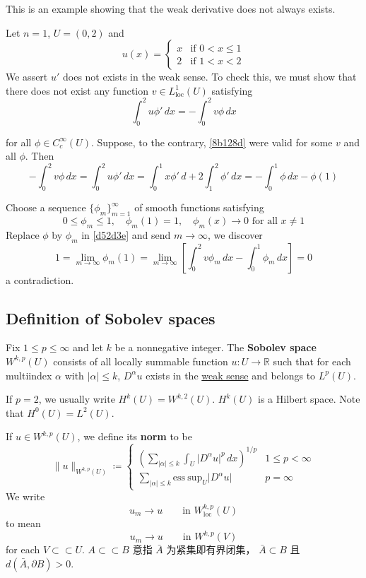 This is an example showing that the weak derivative does not always exists.

Let $n=1$, $U=(0,2)$ and
\[
u(x)=\begin{cases}
x & \text{if }0<x\leq 1  \\
2 & \text{if }1<x<2
\end{cases}
\]
We assert $u'$ does not exists in the weak sense. To check this, we must show that there does not exist any function $v\in L^{1}_{\text{loc}}(U)$ satisfying
\begin{equation}
\int_{0}^{2} u\phi' \, dx =-\int_{0}^{2} v\phi \, dx
\label{8b128d}
\end{equation}

for all $\phi\in C^{\infty}_{c}(U)$. Suppose, to the contrary, \cref{8b128d}   were valid for some $v$ and all $\phi$. Then
\begin{equation}
-\int_{0}^{2} v\phi \, dx =\int_{0}^{2} u\phi' \, dx =\int_{0}^{1} x\phi' \, d+2\int_{1}^{2} \phi' \, dx =-\int_{0}^{1} \phi \, dx -\phi(1)
\label{d52d3e}
\end{equation}

Choose a sequence $\{ \phi _m \}_{m=1}^{\infty}$ of smooth functions satisfying
\[
0\leq \phi _m\leq 1,\quad \phi _m(1)=1,\quad \phi _m(x)\to0\text{ for all }x\neq 1
\]
Replace $\phi$ by $\phi _m$ in \cref{d52d3e} and send $m \to \infty$, we discover
\[
1=\lim_{ m \to \infty } \phi _m(1)=\lim_{ m \to \infty } \left[ \int_{0}^{2} v\phi _m \, dx -\int_{0}^{1} \phi _m \, dx  \right]=0
\]
a contradiction.

\subsection{Definition of Sobolev spaces}

Fix $1\leq p\leq \infty$ and let $k$ be a nonnegative integer. The \textbf{Sobolev space} $W^{k,p}(U)$ consists of all locally summable function $u:U\to \mathbb{R}$ such that for each multiindex $\alpha$ with $\lvert \alpha \rvert\leq k$, $D^{\alpha}u$ exists in the \underline{weak sense} and belongs to $L^{p}(U)$.

\begin{remark}
If $p=2$, we usually write $H^{k}(U)=W^{k,2}(U)$. $H^{k}(U)$ is a Hilbert space. Note that $H^{0}(U)=L^{2}(U)$.
\end{remark}
If $u\in W^{k,p}(U)$, we define its \textbf{norm} to be
\[
\lVert u \rVert _{W^{k,p}(U)}\coloneqq \begin{cases}
\left( \sum_{\lvert \alpha \rvert \leq k}\int_{U}^{} \lvert D^{\alpha}u \rvert ^{p} \, dx  \right)^{1/p } & 1\leq p<\infty \\
\sum_{\lvert \alpha \rvert \leq k}\mathrm{ess\ sup} _{U}\lvert D^{\alpha}u \rvert  & p=\infty
\end{cases}
\]
We write
\[
u_m\to u\qquad \text{in }W_{\text{loc}}^{k,p}(U)
\]
to mean
\[
u_m\to u\qquad \text{in }W^{k,p}(V)
\]
for each $V\subset \subset U$. $A \subset \subset B$ 意指 $\bar{A}$ 为紧集即有界闭集， $\bar{A} \subset B$ 且 $d(\bar{A}, \partial B)>0$.

